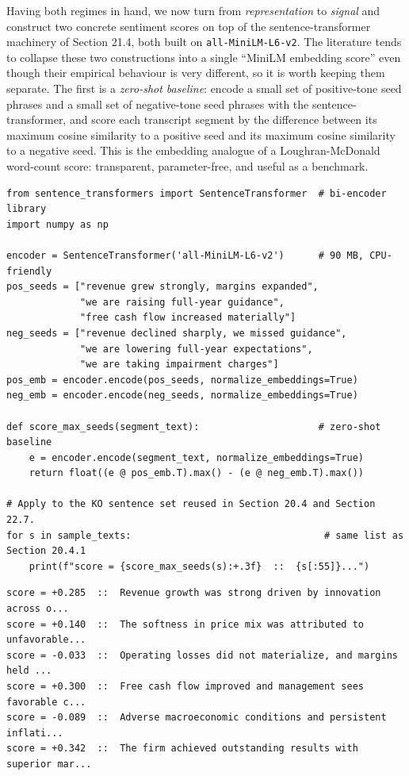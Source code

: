 Having both regimes in hand, we now turn from \textit{representation} to \textit{signal} and construct two concrete sentiment scores on top of the sentence-transformer machinery of Section 21.4, both built on \texttt{all-MiniLM-L6-v2}. The literature tends to collapse these two constructions into a single ``MiniLM embedding score'' even though their empirical behaviour is very different, so it is worth keeping them separate. The first is a \textit{zero-shot baseline}: encode a small set of positive-tone seed phrases and a small set of negative-tone seed phrases with the sentence-transformer, and score each transcript segment by the difference between its maximum cosine similarity to a positive seed and its maximum cosine similarity to a negative seed. This is the embedding analogue of a Loughran-McDonald word-count score: transparent, parameter-free, and useful as a benchmark.

\begin{verbatim}
from sentence_transformers import SentenceTransformer  # bi-encoder library
import numpy as np

encoder = SentenceTransformer('all-MiniLM-L6-v2')      # 90 MB, CPU-friendly
pos_seeds = ["revenue grew strongly, margins expanded",
             "we are raising full-year guidance",
             "free cash flow increased materially"]
neg_seeds = ["revenue declined sharply, we missed guidance",
             "we are lowering full-year expectations",
             "we are taking impairment charges"]
pos_emb = encoder.encode(pos_seeds, normalize_embeddings=True)
neg_emb = encoder.encode(neg_seeds, normalize_embeddings=True)

def score_max_seeds(segment_text):                     # zero-shot baseline
    e = encoder.encode(segment_text, normalize_embeddings=True)
    return float((e @ pos_emb.T).max() - (e @ neg_emb.T).max())

# Apply to the KO sentence set reused in Section 20.4 and Section 22.7.
for s in sample_texts:                                  # same list as Section 20.4.1
    print(f"score = {score_max_seeds(s):+.3f}  ::  {s[:55]}...")
\end{verbatim}

\begin{verbatim}
score = +0.285  ::  Revenue growth was strong driven by innovation across o...
score = +0.140  ::  The softness in price mix was attributed to unfavorable...
score = -0.033  ::  Operating losses did not materialize, and margins held ...
score = +0.300  ::  Free cash flow improved and management sees favorable c...
score = -0.089  ::  Adverse macroeconomic conditions and persistent inflati...
score = +0.342  ::  The firm achieved outstanding results with superior mar...
\end{verbatim}

